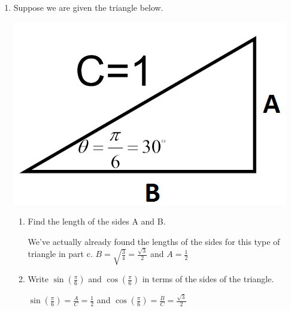 \documentclass[nooutcomes]{ximera}
\begin{document}
\begin{problem}
\begin{enumerate}
\begin{enumerate}
\begin{freeResponse}
	\end{freeResponse}
	\end{enumerate}

\item Suppose we are given the triangle below.  
		\begin{image}
		\includegraphics[scale=.5]{figure5.png}
		\end{image}

		\begin{enumerate}
	\item Find the length of the sides A and B.
	\begin{freeResponse}
	We've actually already found the lengths of the sides for this type of triangle in part c.  $B=\sqrt{\frac{3}{4}}=\frac{\sqrt{3}}{2}$ and $A=\frac{1}{2}$ 
	\end{freeResponse}

	\item Write $\sin\left(\frac{\pi}{6}\right)$ and $\cos\left(\frac{\pi}{6}\right)$ in terms of the sides of the triangle.

	\begin{freeResponse}
	$\sin\left(\frac{\pi}{6}\right)=\frac{A}{C}=\frac{1}{2}$ and $\cos\left(\frac{\pi}{6}\right)=\frac{B}{C}=\frac{\sqrt{3}}{2}$

	\end{freeResponse}
	\end{enumerate}




\end{enumerate}
\end{problem}
\end{document}
